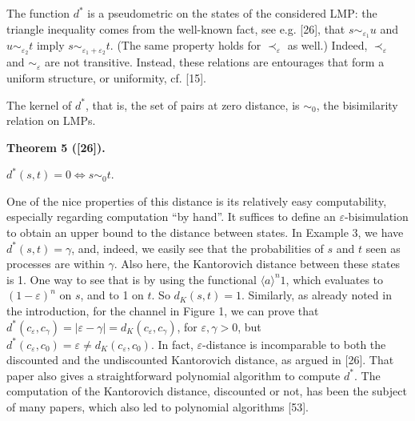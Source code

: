  
 
 
The function $d^{*}$ is a pseudometric on the states of the considered LMP: the triangle inequality comes from the well-known fact, see e.g. [26], that $s\sim_{\varepsilon_{1}}u$ and $u\sim_{\varepsilon_{2}}t$ imply $s\sim_{\varepsilon_{1}+\varepsilon_{2}}t$. (The same property holds for $\prec_{\varepsilon}$ as well.) Indeed, $\prec_{\varepsilon}$ and $\sim_{\varepsilon}$ are not transitive. Instead, these relations are entourages that form a uniform structure, or uniformity, cf. [15].\par
 
 
 
The kernel of $d^{*}$, that is, the set of pairs at zero distance, is $\sim_{0}$, the bisimilarity relation on LMPs.\par
 
 
 
\par\medskip\noindent\textbf{Theorem 5 ([26]).}\par
 
 
$d^{*}(s,t)=0\Leftrightarrow s\sim_{0}t$.\par
 
 
 
 
One of the nice properties of this distance is its relatively easy computability, especially regarding computation “by hand”. It suffices to define an $\varepsilon$-bisimulation to obtain an upper bound to the distance between states. In Example 3, we have $d^{*}(s,t)=\gamma$, and, indeed, we easily see that the probabilities of $s$ and $t$ seen as processes are within $\gamma$. Also here, the Kantorovich distance between these states is 1. One way to see that is by using the functional $\langle a\rangle^{n}1$, which evaluates to $(1-\varepsilon)^{n}$ on $s$, and to 1 on $t$. So $d_{K}(s,t)=1$. Similarly, as already noted in the introduction, for the channel in Figure 1, we can prove that $d^{*}(c_{\varepsilon},c_{\gamma})=|\varepsilon-\gamma|=d_{K}(c_{\varepsilon},c_{\gamma})$, for $\varepsilon,\gamma>0$, but $d^{*}(c_{\varepsilon},c_{0})=\varepsilon\neq d_{K}(c_{\varepsilon},c_{0})$. In fact, $\varepsilon$-distance is incomparable to both the discounted and the undiscounted Kantorovich distance, as argued in [26]. That paper also gives a straightforward polynomial algorithm to compute $d^{*}$. The computation of the Kantorovich distance, discounted or not, has been the subject of many papers, which also led to polynomial algorithms [53].\par
 
